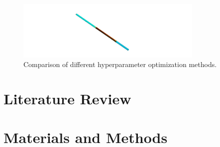 \documentclass{report}
\begin{document}
        \begin{figure}[h]
            \centering
            \includegraphics[width=0.8\textwidth]{00_Images/00_Velocity.png}
            \caption{Comparison of different hyperparameter optimization methods.}
            \label{fig:hyperparameter_optimization}
        \end{figure}
    
\newpage \chapter{Literature Review}

\newpage \chapter{Materials and Methods}

\end{document}
